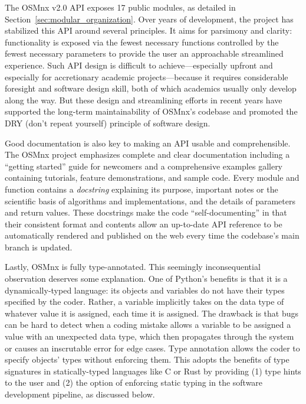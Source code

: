 \documentclass[12pt,letterpaper]{article} %
\begin{document}
The OSMnx v2.0 API exposes 17 public modules, as detailed in Section~\ref{sec:modular_organization}. Over years of development, the project has stabilized this API around several principles. It aims for parsimony and clarity: functionality is exposed via the fewest necessary functions controlled by the fewest necessary parameters to provide the user an approachable streamlined experience. Such API design is difficult to achieve---especially upfront and especially for accretionary academic projects---because it requires considerable foresight and software design skill, both of which academics usually only develop along the way. But these design and streamlining efforts in recent years have supported the long-term maintainability of OSMnx's codebase and promoted the DRY (don't repeat yourself) principle of software design.

Good documentation is also key to making an API usable and comprehensible. The OSMnx project emphasizes complete and clear documentation including a \enquote{getting started} guide for newcomers and a comprehensive examples gallery containing tutorials, feature demonstrations, and sample code. Every module and function contains a \textit{docstring} explaining its purpose, important notes or the scientific basis of algorithms and implementations, and the details of parameters and return values. These docstrings make the code \enquote{self-documenting} in that their consistent format and contents allow an up-to-date API reference to be automatically rendered and published on the web every time the codebase's main branch is updated.

Lastly, OSMnx is fully type-annotated. This seemingly inconsequential observation deserves some explanation. One of Python's benefits is that it is a dynamically-typed language: its objects and variables do not have their types specified by the coder. Rather, a variable implicitly takes on the data type of whatever value it is assigned, each time it is assigned. The drawback is that bugs can be hard to detect when a coding mistake allows a variable to be assigned a value with an unexpected data type, which then propagates through the system or causes an inscrutable error for edge cases. Type annotation allows the coder to specify objects' types without enforcing them. This adopts the benefits of type signatures in statically-typed languages like C or Rust by providing (1) type hints to the user and (2) the option of enforcing static typing in the software development pipeline, as discussed below.
\end{document}
